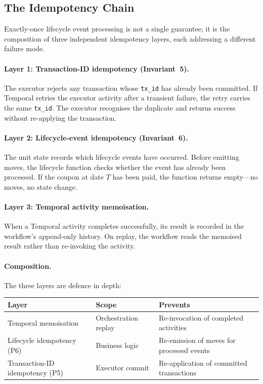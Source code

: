 \documentclass[11pt,a4paper]{article}
\begin{document}
\subsection{The Idempotency Chain}
\label{sec:temporal-idempotency}

Exactly-once lifecycle event processing is not a single guarantee; it is the composition of three independent idempotency layers, each addressing a different failure mode.

\paragraph{Layer 1: Transaction-ID idempotency (Invariant~5).}
The executor rejects any transaction whose \texttt{tx\_id} has already been committed. If Temporal retries the executor activity after a transient failure, the retry carries the same \texttt{tx\_id}. The executor recognises the duplicate and returns success without re-applying the transaction.

\paragraph{Layer 2: Lifecycle-event idempotency (Invariant~6).}
The unit state records which lifecycle events have occurred. Before emitting moves, the lifecycle function checks whether the event has already been processed. If the coupon at date $T$ has been paid, the function returns empty---no moves, no state change.

\paragraph{Layer 3: Temporal activity memoisation.}
When a Temporal activity completes successfully, its result is recorded in the workflow's append-only history. On replay, the workflow reads the memoised result rather than re-invoking the activity.

\paragraph{Composition.}
The three layers are defence in depth:

\begin{center}
\small
\begin{tabular}{l l l}
\toprule
\textbf{Layer} & \textbf{Scope} & \textbf{Prevents} \\
\midrule
Temporal memoisation & Orchestration replay & Re-invocation of completed activities \\
Lifecycle idempotency (P6) & Business logic & Re-emission of moves for processed events \\
Transaction-ID idempotency (P5) & Executor commit & Re-application of committed transactions \\
\bottomrule
\end{tabular}
\end{center}
\end{document}
